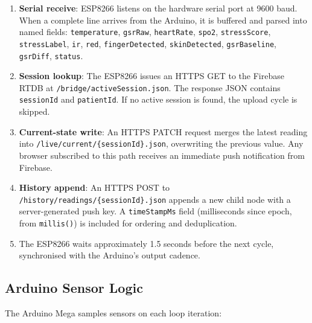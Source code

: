 \documentclass[12pt,a4paper]{report}
\begin{document}
\begin{enumerate}[leftmargin=1.5em, itemsep=0.2em]
  \item \textbf{Serial receive}: ESP8266 listens on the hardware serial
        port at 9600 baud. When a complete line arrives from the Arduino,
        it is buffered and parsed into named fields:
        \texttt{temperature}, \texttt{gsrRaw}, \texttt{heartRate},
        \texttt{spo2}, \texttt{stressScore}, \texttt{stressLabel},
        \texttt{ir}, \texttt{red}, \texttt{fingerDetected},
        \texttt{skinDetected}, \texttt{gsrBaseline}, \texttt{gsrDiff},
        \texttt{status}.

  \item \textbf{Session lookup}: The ESP8266 issues an HTTPS GET to
        the Firebase RTDB at \texttt{/bridge/activeSession.json}.
        The response JSON contains \texttt{sessionId} and
        \texttt{patientId}. If no active session is found, the upload
        cycle is skipped.

  \item \textbf{Current-state write}: An HTTPS PATCH request merges
        the latest reading into \texttt{/live/current/\{sessionId\}.json},
        overwriting the previous value. Any browser subscribed to this
        path receives an immediate push notification from Firebase.

  \item \textbf{History append}: An HTTPS POST to
        \texttt{/history/readings/\{sessionId\}.json} appends a new
        child node with a server-generated push key. A
        \texttt{timeStampMs} field (milliseconds since epoch, from
        \texttt{millis()}) is included for ordering and deduplication.

  \item The ESP8266 waits approximately 1.5 seconds before the next
        cycle, synchronised with the Arduino's output cadence.
\end{enumerate}

\subsection{Arduino Sensor Logic}

The Arduino Mega samples sensors on each loop iteration:
\end{document}

